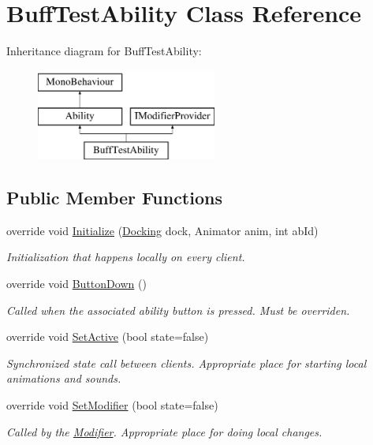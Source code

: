 \hypertarget{class_buff_test_ability}{}\section{Buff\+Test\+Ability Class Reference}
\label{class_buff_test_ability}
Inheritance diagram for Buff\+Test\+Ability\+:\begin{figure}[H]
\begin{center}
\leavevmode
\includegraphics[height=3.000000cm]{class_buff_test_ability}
\end{center}
\end{figure}
\subsection*{Public Member Functions}
\begin{DoxyCompactItemize}
\item 
override void \hyperlink{class_buff_test_ability_a205cdf654967c0884499c1cf15a92c7c}{Initialize} (\hyperlink{class_docking}{Docking} dock, Animator anim, int ab\+Id)
\begin{DoxyCompactList}\small\item\em Initialization that happens locally on every client. \end{DoxyCompactList}\item 
override void \hyperlink{class_buff_test_ability_a45e7ab9bd436078b50ed112b75e97508}{Button\+Down} ()
\begin{DoxyCompactList}\small\item\em Called when the associated ability button is pressed. Must be overriden. \end{DoxyCompactList}\item 
override void \hyperlink{class_buff_test_ability_ad69d427a9797a40716e11a0a5acd7f31}{Set\+Active} (bool state=false)
\begin{DoxyCompactList}\small\item\em Synchronized state call between clients. Appropriate place for starting local animations and sounds. \end{DoxyCompactList}\item 
override void \hyperlink{class_buff_test_ability_a24f2ac23a4f1644af087c1e4162f4267}{Set\+Modifier} (bool state=false)
\begin{DoxyCompactList}\small\item\em Called by the \hyperlink{class_modifier}{Modifier}. Appropriate place for doing local changes. \end{DoxyCompactList}\end{DoxyCompactItemize}

